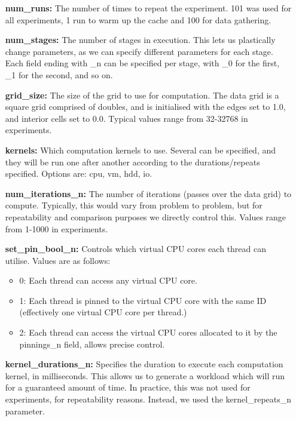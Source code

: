 \begin{itemize}
    \item[\textbf{num\_runs:}]            The number of times to repeat the experiment. 101 was used for all experiments, 1 run to warm up the cache and 100 for data gathering.
    
    \item[\textbf{num\_stages:}]          The number of stages in execution. This lets us plastically change parameters, as we can specify different parameters for each stage. Each field ending with \_n can be specified per stage, with \_0 for the first, \_1 for the second, and so on.
    
    \item[\textbf{grid\_size:}]           The size of the grid to use for computation. The data grid is a square grid comprised of doubles, and is initialised with the edges set to 1.0, and interior cells set to 0.0. Typical values range from 32-32768 in experiments.
    
    \item[\textbf{kernels:}]              Which computation kernels to use. Several can be specified, and they will be run one after another according to the durations/repeats specified. Options are: cpu, vm, hdd, io.
    
    \item[\textbf{num\_iterations\_n:}]   The number of iterations (passes over the data grid) to compute. Typically, this would vary from problem to problem, but for repeatability and comparison purposes we directly control this. Values range from 1-1000 in experiments.
    
    \item[\textbf{set\_pin\_bool\_n:}]    Controls which virtual CPU cores each thread can utilise. Values are as follows:
        \begin{itemize}
            \item 0: Each thread can access any virtual CPU core.
            \item 1: Each thread is pinned to the virtual CPU core with the same ID (effectively one virtual CPU core per thread.)
            \item 2: Each thread can access the virtual CPU cores allocated to it by the pinnings\_n field, allows precise control.
        \end{itemize}
    
    \item[\textbf{kernel\_durations\_n:}] Specifies the duration to execute each computation kernel, in milliseconds. This allows us to generate a workload which will run for a guaranteed amount of time. In practice, this was not used for experiments, for repeatability reasons. Instead, we used the kernel\_repeats\_n parameter.
    

\end{itemize}
